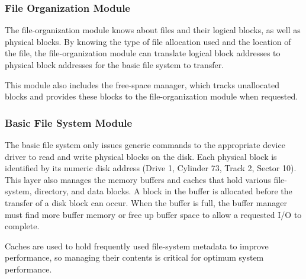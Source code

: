 \subsubsection{File Organization Module}\label{subsubsec:File_Organization_FS_Module}
The file-organization module knows about files and their logical blocks, as well as physical blocks.
By knowing the type of file allocation used and the location of the file, the file-organization module can translate logical block addresses to physical block addresses for the basic file system to transfer.

This module also includes the free-space manager, which tracks unallocated blocks and provides these blocks to the file-organization module when requested.

\subsubsection{Basic File System Module}\label{subsubsec:Basic_FS_Module}
The basic file system only issues generic commands to the appropriate device driver to read and write physical blocks on the disk.
Each physical block is identified by its numeric disk address (Drive 1, Cylinder 73, Track 2, Sector 10).
This layer also manages the memory buffers and caches that hold various file-system, directory, and data blocks.
A block in the buffer is allocated before the transfer of a disk block can occur.
When the buffer is full, the buffer manager must find more buffer memory or free up buffer space to allow a requested I/O to complete.

Caches are used to hold frequently used file-system metadata to improve performance, so managing their contents is critical for optimum system performance.


